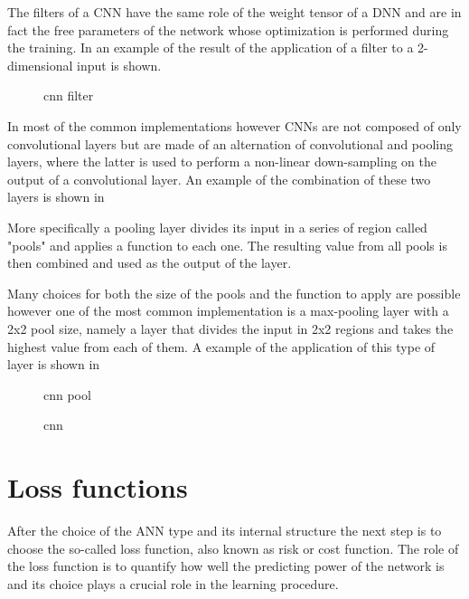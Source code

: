 The filters of a CNN have the same role of the weight tensor of a DNN and are in fact the free parameters of the network whose optimization is performed during the training. In  an example of the result of the application of a filter to a 2-dimensional input is shown.


\begin{figure}
    \centering
      
    \caption{cnn filter}
    \label{fig:cnn_filter}
\end{figure}



In most of the common implementations however CNNs are not composed of only convolutional layers but are made of an alternation of convolutional and pooling layers, where the latter is used to  perform a non-linear down-sampling on the output of a convolutional layer. An example of the combination of these two layers is shown in 


More specifically a pooling layer divides its input in a series of region called "pools" and applies a function to each one.
The resulting value from all pools is then combined and used as the output of the layer.

Many choices for both the size of the pools and the function to apply are possible however one of the most common implementation is a max-pooling layer with a 2x2 pool size, namely a layer that divides the input in 2x2 regions and takes the highest value from each of them. A example of the application of this type of layer is shown in  

\begin{figure}
    \centering
     
    \caption{cnn pool}
    \label{fig:cnn_pool}
\end{figure}


\begin{figure}
    \centering

  
    \caption{cnn }
    \label{fig:cnn_tot}
\end{figure}


\section{Loss functions} \label{lossfunction}

After the choice of the ANN type and its internal structure the next step is to choose the so-called loss function, also known as risk or cost function. The role of the loss function is to quantify how well the predicting power of the network is and its choice plays a crucial role in the learning procedure.

